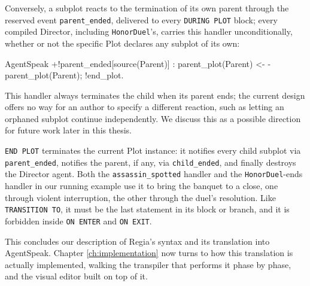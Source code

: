 Conversely, a subplot reacts to the termination of its own parent through the reserved event \lstinline|parent_ended|, delivered to every \lstinline|DURING PLOT| block; every compiled Director, including \lstinline|HonorDuel|'s, carries this handler unconditionally, whether or not the specific Plot declares any subplot of its own:

\begin{codeblock}[]{AgentSpeak}
+!parent_ended[source(Parent)] : parent_plot(Parent) <-
    -parent_plot(Parent);
    !end_plot.
\end{codeblock}

This handler always terminates the child when its parent ends; the current design offers no way for an author to specify a different reaction, such as letting an orphaned subplot continue independently. We discuss this as a possible direction for future work later in this thesis.

\lstinline|END PLOT| terminates the current Plot instance: it notifies every child subplot via \lstinline|parent_ended|, notifies the parent, if any, via \lstinline|child_ended|, and finally destroys the Director agent. Both the \lstinline|assassin_spotted| handler and the \lstinline|HonorDuel|-ends handler in our running example use it to bring the banquet to a close, one through violent interruption, the other through the duel's resolution. Like \lstinline|TRANSITION TO|, it must be the last statement in its block or branch, and it is forbidden inside \lstinline|ON ENTER| and \lstinline|ON EXIT|.

This concludes our description of Regia's syntax and its translation into AgentSpeak. Chapter \ref{ch:implementation} now turns to how this translation is actually implemented, walking the transpiler that performs it phase by phase, and the visual editor built on top of it.

